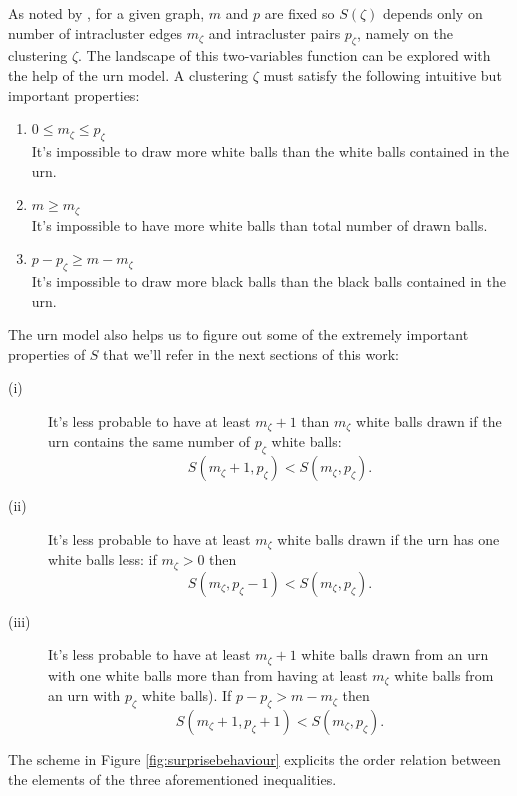 As noted by \cite{Fleck2014}, for a given graph, $m$ and $p$ are fixed so $S(\zeta)$ depends only on number of intracluster edges $m_\zeta$ and intracluster pairs $p_\zeta$, namely on the clustering $\zeta$.
The landscape of this two-variables function can be explored with the help of the urn model. A clustering $\zeta$ must satisfy the following intuitive but important properties:
\begin{enumerate}\label{list:urn_model_properties}
\item $0 \leq m_\zeta \leq p_\zeta$\\It's impossible to draw more white balls than the white balls contained in the urn.
\item $m\geq m_\zeta$\\It's impossible to have more white balls than total number of drawn balls.
\item $p-p_\zeta \geq m-m_\zeta$\\It's impossible to draw more black balls than the black balls contained in the urn.
\end{enumerate}
The urn model also helps us to figure out some of the extremely important properties of $S$ that we'll refer in the next sections of this work:
\begin{description}
\item[(i)]\label{list:surprise_properties} It's less probable to have at least $m_\zeta+1$ than $m_\zeta$ white balls drawn if the urn contains the same number of $p_\zeta$ white balls:
$$S(m_\zeta+1,p_\zeta) < S(m_\zeta,p_\zeta).$$
\item[(ii)] It's less probable to have at least $m_\zeta$ white balls drawn if the urn has one white balls less: if $m_\zeta >0$ then $$S(m_\zeta,p_\zeta-1) < S(m_\zeta,p_\zeta).$$
\item[(iii)] It's less probable to have at least $m_\zeta+1$ white balls drawn from an urn with one white balls more than from having at least $m_\zeta$ white balls from an urn with $p_\zeta$ white balls). If $p-p_\zeta> m-m_\zeta$ then $$S(m_\zeta+1,p_\zeta+1) < S(m_\zeta,p_\zeta).$$
\end{description}
The scheme in Figure \ref{fig:surprisebehaviour} explicits the order relation between the elements of the three aforementioned inequalities.
